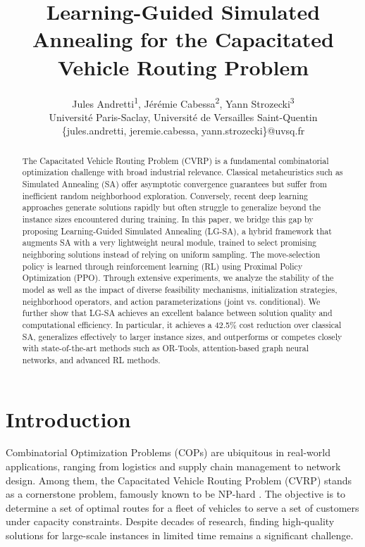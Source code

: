 \documentclass[letterpaper]{article} %
\title{Learning-Guided Simulated Annealing for the Capacitated Vehicle Routing Problem}
\author{
Jules Andretti\textsuperscript{\rm 1}, 
Jérémie Cabessa\textsuperscript{\rm 2}, 
Yann Strozecki\textsuperscript{\rm 3} \\
Université Paris-Saclay, Université de Versailles Saint-Quentin \\
\{jules.andretti, jeremie.cabessa, yann.strozecki\}@uvsq.fr
}
\begin{document}
\maketitle

\begin{abstract}
The Capacitated Vehicle Routing Problem (CVRP) is a fundamental combinatorial optimization challenge with broad industrial relevance. Classical metaheuristics such as Simulated Annealing (SA) offer asymptotic convergence guarantees but suffer from inefficient random neighborhood exploration. Conversely, recent deep learning approaches generate solutions rapidly but often struggle to generalize beyond the instance sizes encountered during training. In this paper, we bridge this gap by proposing Learning-Guided Simulated Annealing (LG-SA), a hybrid framework that augments SA with a very lightweight neural module, trained to select promising neighboring solutions instead of relying on uniform sampling. The move-selection policy is learned through reinforcement learning (RL) using Proximal Policy Optimization (PPO). Through extensive experiments, we analyze the stability of the model as well as the impact of diverse feasibility mechanisms, initialization strategies, neighborhood operators, and action parameterizations (joint vs. conditional). We further show that LG-SA achieves an excellent balance between solution quality and computational efficiency. In particular, it achieves a 42.5\% cost reduction over classical SA, generalizes effectively to larger instance sizes, and outperforms or competes closely with state-of-the-art methods such as OR-Tools, attention-based graph neural networks, and advanced RL methods.
\end{abstract}


\section{Introduction}

Combinatorial Optimization Problems (COPs) are ubiquitous in real-world applications, ranging from logistics and supply chain management to network design. Among them, the Capacitated Vehicle Routing Problem (CVRP) stands as a cornerstone problem, famously known to be NP-hard \citep{dantzig_truck_1959, liu_heuristics_2023, shi_brief_2023, bogyrbayeva_learning_2022}. The objective is to determine a set of optimal routes for a fleet of vehicles to serve a set of customers under capacity constraints. Despite decades of research, finding high-quality solutions for large-scale instances in limited time remains a significant challenge.
\end{document}
